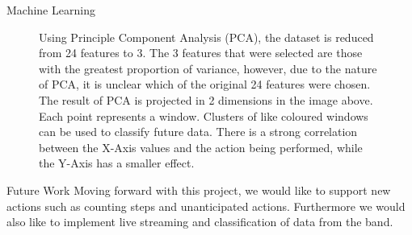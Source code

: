 \documentclass[22pt]{beamer}
\begin{document}
\begin{frame}[fragile]
\begin{textblock}{7.25}
\begin{block}{Machine Learning}
\begin{figure}
\caption{
Using Principle Component Analysis (PCA), the dataset is reduced from 24 features to 3\cite{scikit-learn}. The 3 features that were selected are those with the greatest proportion of variance, however, due to the nature of PCA, it is unclear which of the original 24 features were chosen. The result of PCA is projected in 2 dimensions in the image above. Each point represents a window. Clusters of like coloured windows can be used to classify future data. There is a strong correlation between the X-Axis values and the action being performed, while the Y-Axis has a smaller effect.}
\end{figure}
\end{block}

\begin{block}{Future Work}
Moving forward with this project, we would like to support new actions such as counting steps and unanticipated actions. Furthermore we would also like to implement live streaming and classification of data from the band.
\end{block}

\end{textblock}

\end{frame}
\end{document}
